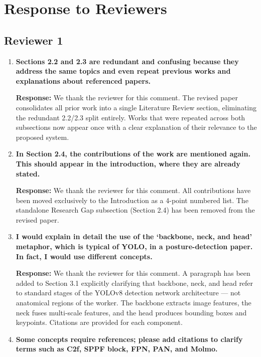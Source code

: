 \section*{Response to Reviewers}

\subsection*{Reviewer 1}

\begin{enumerate}
    \item \textbf{Sections 2.2 and 2.3 are redundant and confusing because they address the same topics and even repeat previous works and explanations about referenced papers.}

    \textbf{Response:} We thank the reviewer for this comment. The revised paper consolidates all prior work into a single Literature Review section, eliminating the redundant 2.2/2.3 split entirely. Works that were repeated across both subsections now appear once with a clear explanation of their relevance to the proposed system.

    \item \textbf{In Section 2.4, the contributions of the work are mentioned again. This should appear in the introduction, where they are already stated.}

    \textbf{Response:} We thank the reviewer for this comment. All contributions have been moved exclusively to the Introduction as a 4-point numbered list. The standalone Research Gap subsection (Section 2.4) has been removed from the revised paper.

    \item \textbf{I would explain in detail the use of the `backbone, neck, and head' metaphor, which is typical of YOLO, in a posture-detection paper. In fact, I would use different concepts.}

    \textbf{Response:} We thank the reviewer for this comment. A paragraph has been added to Section 3.1 explicitly clarifying that backbone, neck, and head refer to standard stages of the YOLOv8 detection network architecture --- not anatomical regions of the worker. The backbone extracts image features, the neck fuses multi-scale features, and the head produces bounding boxes and keypoints. Citations are provided for each component.

    \item \textbf{Some concepts require references; please add citations to clarify terms such as C2f, SPPF block, FPN, PAN, and Molmo.}


\end{enumerate}
